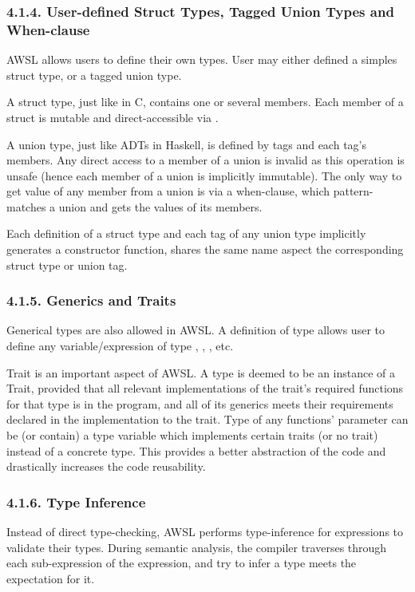 \documentclass[10pt,a4paper,]{report}
\begin{document}
  \subsubsection*{4.1.4. User-defined Struct Types, Tagged Union Types and When-clause}
  AWSL allows users to define their own types. User may either defined a simples
  struct type, or a tagged union type.

  A struct type, just like  in C, contains one or several
  members. Each member of a struct is mutable and direct-accessible via
  .

  A union type, just like ADTs in Haskell, is defined by tags and each tag's
  members. Any direct access to a member of a union is invalid as this operation
  is unsafe (hence each member of a union is implicitly immutable). The only way
  to get value of any member from a union is via a when-clause, which
  pattern-matches a union and gets the values of its members.

  Each definition of a struct type and each tag of any union type implicitly
  generates a constructor function, shares the same name aspect the
  corresponding struct type or union tag.

  \subsubsection*{4.1.5. Generics and Traits}
  Generical types are also allowed in AWSL. A definition of type
   allows user to define any variable/expression 
  of type , ,
  , etc.

  Trait is an important aspect of AWSL. A type is deemed to be an instance of a
  Trait, provided that all relevant implementations of the trait's required
  functions for that type is in the program, and all of its generics meets their
  requirements declared in the implementation to the trait. Type of any
  functions' parameter can be (or contain) a type variable which implements
  certain traits (or no trait) instead of a concrete type. This provides a
  better abstraction of the code and drastically increases the code reusability. 

  \subsubsection*{4.1.6. Type Inference}
  Instead of direct type-checking, AWSL performs type-inference for expressions
  to validate their types. During semantic analysis, the compiler traverses
  through each sub-expression of the expression, and try to infer a type meets
  the expectation for it. 
\end{document}
